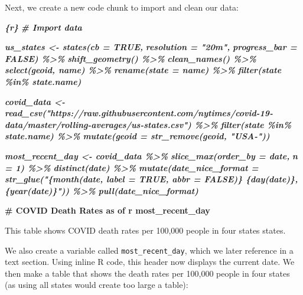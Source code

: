 \documentclass[
]{book}
\newenvironment{Shaded}{\begin{snugshade}}{\end{snugshade}}
\newcommand{\FunctionTok}[1]{\textcolor[rgb]{0.13,0.29,0.53}{\textbf{#1}}}
\newcommand{\InformationTok}[1]{\textcolor[rgb]{0.56,0.35,0.01}{\textbf{\textit{#1}}}}
\newcommand{\NormalTok}[1]{#1}
\begin{document}
Next, we create a new code chunk to import and clean our data:

\begin{Shaded}
\begin{Highlighting}[]
\InformationTok{\textasciigrave{}\textasciigrave{}\textasciigrave{}\{r\}}
\InformationTok{\# Import data}

\InformationTok{us\_states \textless{}{-} states(cb = TRUE, }
\InformationTok{                    resolution = "20m",}
\InformationTok{                    progress\_bar = FALSE) \%\textgreater{}\%}
\InformationTok{  shift\_geometry() \%\textgreater{}\% }
\InformationTok{  clean\_names() \%\textgreater{}\% }
\InformationTok{  select(geoid, name) \%\textgreater{}\% }
\InformationTok{  rename(state = name) \%\textgreater{}\% }
\InformationTok{  filter(state \%in\% state.name)}

\InformationTok{covid\_data \textless{}{-} read\_csv("https://raw.githubusercontent.com/nytimes/covid{-}19{-}data/master/rolling{-}averages/us{-}states.csv") \%\textgreater{}\% }
\InformationTok{  filter(state \%in\% state.name) \%\textgreater{}\% }
\InformationTok{  mutate(geoid = str\_remove(geoid, "USA{-}")) }

\InformationTok{most\_recent\_day \textless{}{-} covid\_data \%\textgreater{}\% }
\InformationTok{  slice\_max(order\_by = date,}
\InformationTok{            n = 1) \%\textgreater{}\% }
\InformationTok{  distinct(date) \%\textgreater{}\% }
\InformationTok{  mutate(date\_nice\_format = str\_glue("\{month(date, label = TRUE, abbr = FALSE)\} \{day(date)\}, \{year(date)\}")) \%\textgreater{}\% }
\InformationTok{  pull(date\_nice\_format)}
\InformationTok{\textasciigrave{}\textasciigrave{}\textasciigrave{}}

\FunctionTok{\# COVID Death Rates as of \textasciigrave{}r most\_recent\_day\textasciigrave{}}

\NormalTok{This table shows COVID death rates per 100,000 people in four states states.}
\end{Highlighting}
\end{Shaded}

We also create a variable called \texttt{most\_recent\_day}, which we later reference in a text section. Using inline R code, this header now displays the current date. We then make a table that shows the death rates per 100,000 people in four states (as using all states would create too large a table):
\end{document}
